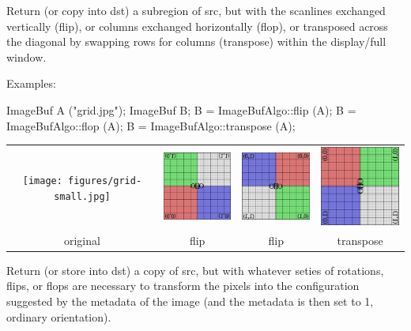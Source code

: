 Return (or copy into {\cf dst}) a subregion of {\cf src}, but with the
scanlines exchanged vertically (flip), or columns exchanged horizontally
(flop), or transposed across the diagonal by swapping rows for columns
(transpose) within the display/full window.

\smallskip
\noindent Examples:
\begin{code}
    ImageBuf A ("grid.jpg");
    ImageBuf B;
    B = ImageBufAlgo::flip (A);
    B = ImageBufAlgo::flop (A);
    B = ImageBufAlgo::transpose (A);
\end{code}

\noindent \begin{tabular}{cccc}
\texttt{[image: figures/grid-small.jpg]} &
\includegraphics[width=1.25in]{figures/flip.jpg} &
\includegraphics[width=1.25in]{figures/flop.jpg} &
\includegraphics[width=1.25in]{figures/transpose.jpg} \\
original & flip & flip & transpose
\end{tabular}
\apiend


 

Return (or store into {\cf dst}) a copy of {\cf src}, but with whatever
seties of rotations, flips, or flops are necessary to transform the pixels
into the configuration suggested by the  metadata of the
image (and the  metadata is then set to 1, ordinary
orientation).

